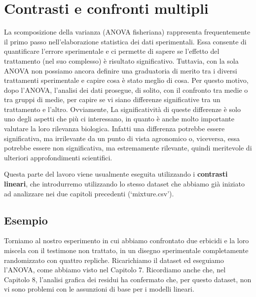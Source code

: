 \documentclass[a4paper,12pt,oneside]{book}
\begin{document}
\hypertarget{contrasti-e-confronti-multipli}{%
\chapter{Contrasti e confronti multipli}\label{contrasti-e-confronti-multipli}}

La scomposizione della varianza (ANOVA fisheriana) rappresenta frequentemente il primo passo nell'elaborazione statistica dei dati sperimentali. Essa consente di quantificare l'errore sperimentale e ci permette di sapere se l'effetto del trattamento (nel suo complesso) è risultato significativo. Tuttavia, con la sola ANOVA non possiamo ancora definire una graduatoria di merito tra i diversi trattamenti sperimentale e capire cosa è stato meglio di cosa. Per questo motivo, dopo l'ANOVA, l'analisi dei dati prosegue, di solito, con il confronto tra medie o tra gruppi di medie, per capire se vi siano differenze significative tra un trattamento e l'altro. Ovviamente, La significatività di queste differenze è solo uno degli aspetti che più ci interessano, in quanto è anche molto importante valutare la loro rilevanza biologica. Infatti una differenza potrebbe essere significativa, ma irrilevante da un punto di vista agronomico o, viceversa, essa potrebbe essere non significativa, ma estremamente rilevante, quindi meritevole di ulteriori approfondimenti scientifici.

Questa parte del lavoro viene usualmente eseguita utilizzando i \textbf{contrasti lineari}, che introdurremo utilizzando lo stesso dataset che abbiamo già iniziato ad analizzare nei due capitoli precedenti (`mixture.csv').

\hypertarget{esempio}{%
\section{Esempio}\label{esempio}}

Torniamo al nostro esperimento in cui abbiamo confrontato due erbicidi e la loro miscela con il testimone non trattato, in un disegno sperimentale completamente randomizzato con quattro repliche. Ricarichiamo il dataset ed eseguiamo l'ANOVA, come abbiamo visto nel Capitolo 7. Ricordiamo anche che, nel Capitolo 8, l'analisi grafica dei residui ha confermato che, per questo dataset, non vi sono problemi con le assunzioni di base per i modelli lineari.
\end{document}
